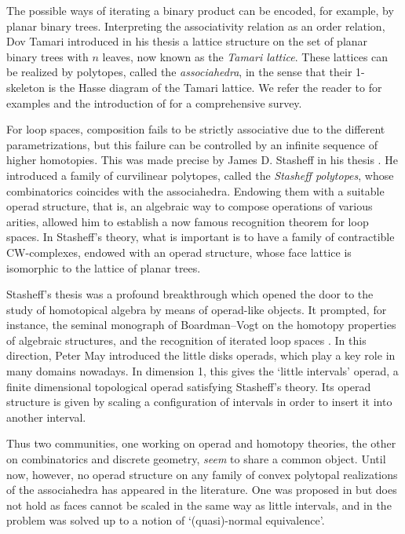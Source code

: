 \documentclass[JEP,XML,SOM,Unicode,NoFloatCountersInSection]{cedram}
\theoremstyle{plain}
\theoremstyle{definition}
\begin{document}
The possible ways of iterating a binary product can be encoded, for example, by planar binary trees. Interpreting the associativity relation as an order relation, Dov Tamari introduced in his thesis \cite{Tamari51} a lattice structure on the set of planar binary trees with $n$ leaves, now known as the \emph{Tamari lattice}. These lattices can be realized by polytopes, called the \emph{associahedra}, in the sense that their 1-skeleton is the Hasse diagram of the Tamari lattice. We refer the reader to \cite{CFZ02, GKZ08, Loday04a} for examples and the introduction of \cite{CSZ15} for a comprehensive survey.

For loop spaces, composition fails to be strictly associative due to the different parametrizations, but this failure can be controlled by an infinite sequence of higher homotopies. This was made precise by James D. Stasheff in his thesis \cite{Stasheff63}. He introduced a family of curvilinear polytopes, called the \emph{Stasheff polytopes}, whose combinatorics coincides with the associahedra. Endowing them with a suitable operad structure, that is, an algebraic way to compose operations of various arities, allowed him to establish a now famous recognition theorem for loop spaces. In Stasheff's theory, what is important is to have
a family of contractible CW-complexes, endowed with an operad structure, whose face lattice is isomorphic to the lattice of planar trees.

Stasheff's thesis was a profound breakthrough which opened the door to the study of homotopical algebra by means of operad-like objects.
It prompted, for instance, the seminal monograph of Boardman--Vogt \cite{BoardmanVogt73} on the homotopy properties of algebraic structures, and the recognition of iterated loop spaces \cite{May72}. In this direction, Peter May introduced the little disks operads, which play a key role in many domains nowadays. In dimension 1, this gives the `little intervals' operad, a finite dimensional topological operad satisfying Stasheff's theory. Its operad structure is given by scaling a configuration of intervals in order to insert it into another interval.

Thus two communities, one working on operad and homotopy theories, the other on combinatorics and discrete geometry, \emph{seem} to share a common object. Until now, however, no operad structure on any family of convex polytopal realizations of the associahedra has appeared in the literature. One was proposed in \cite[Part~II \S1.6]{MSS} but does not hold as faces cannot be scaled in the same way as little intervals, and in \cite{AguiarArdila17} the problem was solved up to a notion of `(quasi)-normal equivalence'.
\end{document}

